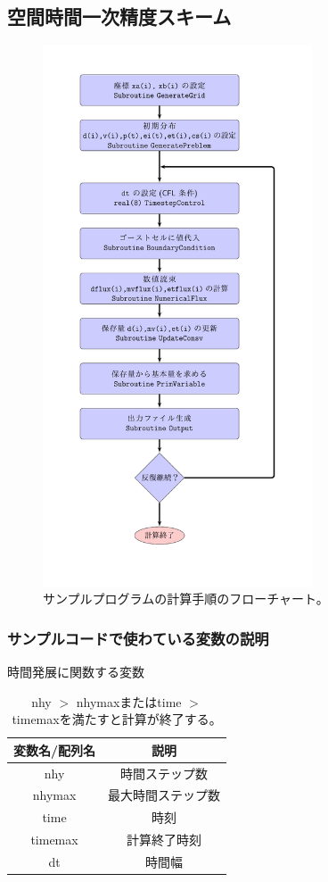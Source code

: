 \subsection{空間時間一次精度スキーム}

\begin{figure}[htpb]
    \centering
    \includegraphics[width=8cm]{flowchart_HD1.pdf}
    \caption{サンプルプログラムの計算手順のフローチャート。
    }
    \label{fig:fc_FV2}
\end{figure}

\subsubsection{サンプルコードで使わている変数の説明}

\begin{table}[h]
\begin{center}
\caption{時間発展に関数する変数}
\begin{tabular}{|c|c|}
    \hline
    変数名/配列名 & 説明 \\
    \hline
    \hline
    {\ttfamily nhy} & 時間ステップ数 \\
    \hline
    {\ttfamily nhymax} & 最大時間ステップ数 \\
    \hline
    {\ttfamily time } & 時刻 \\
    \hline
    {\ttfamily timemax } & 計算終了時刻 \\
    \hline
    {\ttfamily dt} & 時間幅 \\
    \hline
\end{tabular}
\end{center}
\caption{ {\ttfamily nhy $>$ nhymax}または{\ttfamily time $>$ timemax}を満たすと計算が終了する。}
\end{table}


